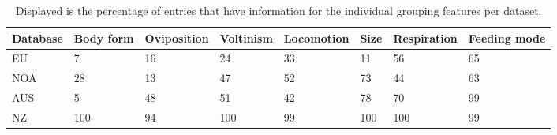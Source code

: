 \documentclass[../Draft_harmonization_paper.tex]{subfiles}
\begin{document}
\begin{table}[ht]
    \centering
    \caption{Displayed is the percentage of entries that have information for the individual grouping features per dataset.} 
    \label{tab:trait_coverage}
    \begin{tabular}{llllllll}
    \toprule[.1em]
    Database & Body form & Oviposition & Voltinism & Locomotion & Size & Respiration & Feeding mode \\ 
    \toprule[.1em]
    EU & 7 & 16 & 24 & 33 & 11 & 56 & 65 \\ 
    NOA & 28 & 13 & 47 & 52 & 73 & 44 & 63 \\ 
    AUS & 5 & 48 & 51 & 42 & 78 & 70 & 99 \\ 
    NZ & 100 & 94 & 100 & 99 & 100 & 100 & 99 \\ 
    \bottomrule
    \end{tabular}
    \end{table}
\end{document}
